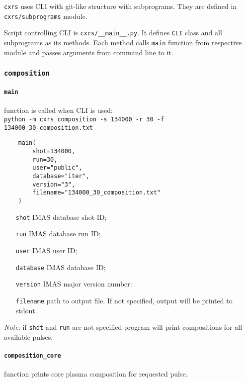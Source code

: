 \documentclass[../../main]{subfiles}
\begin{document}
\texttt{cxrs} uses CLI with git-like structure with subprograms. They are defined in \texttt{cxrs/subprograms} module.

Script controlling CLI is \texttt{cxrs/\_\_main\_\_.py}. It defines \texttt{CLI} class and all subprograms as its methods. Each method calls \texttt{main} function from respective module and passes arguments from command line to it.

\subsubsection{\texttt{composition}}

\paragraph{\texttt{main}} function is called when CLI is used:\\
\texttt{python -m cxrs composition -s 134000 -r 30 -f 134000_30_composition.txt}\\

\begin{verbatim}
    main(
        shot=134000,
        run=30,
        user="public",
        database="iter",
        version="3",
        filename="134000_30_composition.txt"
    )
\end{verbatim}

\begin{itemize}[align=left]
    \item[\texttt{shot}] IMAS database shot ID;
    \item[\texttt{run}] IMAS database run ID;
    \item[\texttt{user}] IMAS user ID;
    \item[\texttt{database}] IMAS database ID;
    \item[\texttt{version}] IMAS major version number:
    \item[\texttt{filename}] path to output file. If not specified, output will be printed to stdout.
\end{itemize}

\emph{Note:} if \texttt{shot} and \texttt{run} are not specified program will print compositions for all available pulses.

\paragraph{\texttt{composition\_core}} function prints core plasma composition for requested pulse.
\end{document}
